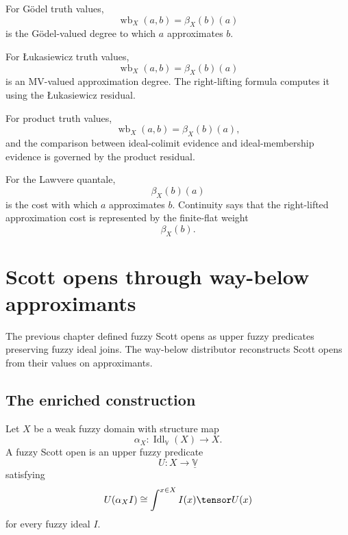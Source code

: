 \begin{example}
\label{ex:continuity-representability-godel}
For G\"odel truth values,
\[
    \operatorname{wb}_X(a,b)
    =
    \beta_X(b)(a)
\]
is the G\"odel-valued degree to which \(a\) approximates \(b\).
\end{example}

\begin{example}
\label{ex:continuity-representability-lukasiewicz}
For {\L}ukasiewicz truth values,
\[
    \operatorname{wb}_X(a,b)
    =
    \beta_X(b)(a)
\]
is an MV-valued approximation degree. The right-lifting formula computes it
using the {\L}ukasiewicz residual.
\end{example}

\begin{example}
\label{ex:continuity-representability-product}
For product truth values,
\[
    \operatorname{wb}_X(a,b)
    =
    \beta_X(b)(a),
\]
and the comparison between ideal-colimit evidence and ideal-membership evidence
is governed by the product residual.
\end{example}

\begin{example}
\label{ex:continuity-representability-lawvere}
For the Lawvere quantale,
\[
    \beta_X(b)(a)
\]
is the cost with which \(a\) approximates \(b\). Continuity says that the
right-lifted approximation cost is represented by the finite-flat weight
\[
    \beta_X(b).
\]
\end{example}

\section{Scott opens through way-below approximants}
\label{sec:scott-opens-through-way-below}

The previous chapter defined fuzzy Scott opens as upper fuzzy predicates
preserving fuzzy ideal joins. The way-below distributor reconstructs Scott opens
from their values on approximants.

\subsection{The enriched construction}
\label{subsec:scott-opens-way-below-enriched}

Let \(X\) be a weak fuzzy domain with structure map
\[
    \alpha_X:\operatorname{Idl}_{\mathbb V}(X)\to X.
\]
A fuzzy Scott open is an upper fuzzy predicate
\[
    U:X\to\underline{\mathbb V}
\]
satisfying
\[
    U(\alpha_X I)
    \cong
    \int^{x\in X}
    I(x)\tensor U(x)
\]
for every fuzzy ideal \(I\).

